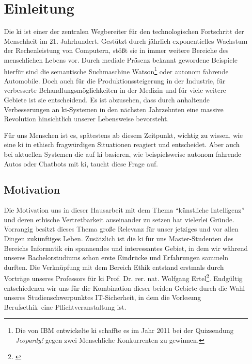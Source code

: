 \section{Einleitung}
Die \ac{ki} ist einer der zentralen Wegbereiter für den technologischen Fortschritt der Menschheit im 21. Jahrhundert.
Gestützt durch jährlich exponentielles Wachstum der Rechenleistung von Computern, stößt sie in immer weitere Bereiche des menschlichen Lebens vor.
Durch mediale Präsenz bekannt gewordene Beispiele hierfür sind die semantische Suchmaschine Watson\footnote{Die von IBM entwickelte \ac{ki} schaffte es im Jahr 2011 bei der Quizsendung \textit{Jeopardy!} gegen zwei Menschliche Konkurrenten zu gewinnen.} oder autonom fahrende Automobile. %
Doch auch für die Produktionssteigerung in der Industrie, für verbesserte Behandlungsmöglichkeiten in der Medizin und für viele weitere Gebiete ist sie entscheidend.
Es ist abzusehen, dass durch anhaltende Verbesserungen an \ac{ki}-Systemen in den nächsten Jahrzehnten eine massive Revolution hinsichtlich unserer Lebensweise bevorsteht.

Für uns Menschen ist es, spätestens ab diesem Zeitpunkt, wichtig zu wissen, wie eine \ac{ki} in ethisch fragwürdigen Situationen reagiert und entscheidet. Aber auch bei aktuellen Systemen die auf \ac{ki} basieren, wie beispielsweise autonom fahrende Autos oder Chatbots mit \ac{ki}, taucht diese Frage auf. 

\subsection{Motivation}
Die Motivation uns in dieser Hausarbeit mit dem Thema \enquote{künstliche Intelligenz} und deren ethische Vertretbarkeit auseinander zu setzen hat vielerlei Gründe. 
Vorrangig besitzt dieses Thema große Relevanz für unser jetziges und vor allen Dingen zukünftiges Leben. 
Zusätzlich ist die \ac{ki} für uns Master-Studenten des Bereichs Informatik ein spannendes und interessantes Gebiet, in dem wir während unseres Bachelorstudiums schon erste Eindrücke und Erfahrungen sammeln durften.
Die Verknüpfung mit dem Bereich Ethik entstand erstmals durch Vorträge unseres Professors für \ac{ki} Prof. Dr. rer. nat. Wolfgang Ertel\footnote{\cite{ProfessorErtel}}. Endgültig entschiedenen wir uns für die Kombination dieser beiden Gebiete durch die Wahl unseres Studienschwerpunktes IT-Sicherheit, in dem die Vorlesung \glqq Berufsethik\grqq\ eine Pflichtveranstaltung ist.


